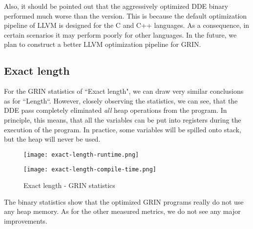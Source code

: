 \documentclass[main.tex]{subfiles}
\begin{document}
	Also, it should be pointed out that the aggressively optimized DDE binary performed much worse than the  version. This is because the default optimization pipeline of LLVM is designed for the C and C++ languages. As a consequence, in certain scenarios it may perform poorly for other languages. In the future, we plan to construct a better LLVM optimization pipeline for GRIN.

	\subsection{Exact length}
	
	For the GRIN statistics of ``Exact length", we can draw very similar conclusions as for ``Length``. However, closely observing the statistics, we can see, that the DDE pass completely eliminated \emph{all} heap operations from the program. In principle, this means, that all the variables can be put into registers during the execution of the program. In practice, some variables will be spilled onto stack, but the heap will never be used.

	\begin{figure}[H]
		\hspace{-0.5cm}
		\renewcommand{\figurename}{Diagram}
		\caption{Exact length - GRIN statistics}
		\label{diagram:exact-length-stats}
		\addtocounter{figure}{-1}
		\begin{minipage}{0.5\textwidth}
			\label{diagram:exact-length-stats-rt}
			\texttt{[image: exact-length-runtime.png]}
		\end{minipage}
		\begin{minipage}{0.5\textwidth}
			\label{diagram:exact-length-stats-ct}
			\texttt{[image: exact-length-compile-time.png]}
		\end{minipage}
	\end{figure}

	The binary statistics show that the optimized GRIN programs really do not use any heap memory. As for the other measured metrics, we do not see any major improvements.
\end{document}
